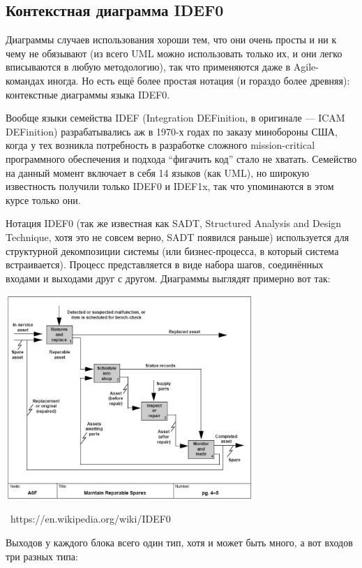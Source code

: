\documentclass[a5paper]{article}
\newcommand{\attribution}[1] {
    \vspace{-4mm}\begin{flushright}\begin{scriptsize}%
    {\textcopyright\, #1}\end{scriptsize}\end{flushright}
}
\begin{document}
\subsection{Контекстная диаграмма IDEF0}

Диаграммы случаев использования хороши тем, что они очень просты и ни к чему не обязывают (из всего UML можно использовать только их, и они легко вписываются в любую методологию), так что применяются даже в Agile-командах иногда. Но есть ещё более простая нотация (и гораздо более древняя): контекстные диаграммы языка IDEF0.

Вообще языки семейства IDEF (Integration DEFinition, в оригинале --- ICAM DEFinition) разрабатывались аж в 1970-х годах по заказу минобороны США, когда у тех возникла потребность в разработке сложного mission-critical программного обеспечения и подхода ``фигачить код'' стало не хватать. Семейство на данный момент включает в себя 14 языков (как UML), но широкую известность получили только IDEF0 и IDEF1x, так что упоминаются в этом курсе только они.

Нотация IDEF0 (так же известная как SADT, Structured Analysis and Design Technique, хотя это не совсем верно, SADT появился раньше) используется для структурной декомпозиции системы (или бизнес-процесса, в который система встраивается). Процесс представляется в виде набора шагов, соединённых входами и выходами друг с другом. Диаграммы выглядят примерно вот так:

\begin{center}
    \includegraphics[width=0.7\textwidth]{idef0.png}
    \attribution{https://en.wikipedia.org/wiki/IDEF0}
\end{center}

Выходов у каждого блока всего один тип, хотя и может быть много, а вот входов три разных типа:
\end{document}
